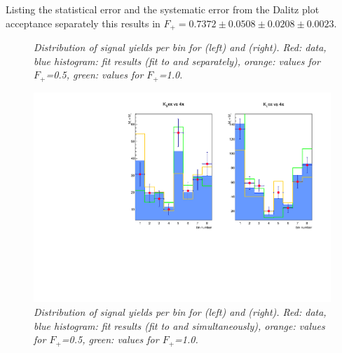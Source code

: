 Listing the statistical error and the systematic error from the Dalitz plot acceptance separately this results in $F_+ = 0.7372 \pm 0.0508 \pm 0.0208 \pm 0.0023$.

\begin{figure}[!h]
\begin{center}
\end{center}
\caption{\textit{Distribution of signal yields per bin for \KsPiPi (left) and \KlPiPi (right). Red: data, blue histogram: fit results (fit to \KsPiPi and \KlPiPi separately), orange: values for $F_+$=0.5, green: values for $F_+$=1.0.}}
\end{figure}

\begin{figure}[!h]
\begin{center}
 \includegraphics[width=1. \textwidth] {Sim_F_Comp.pdf}
\end{center}
\caption{\textit{Distribution of signal yields per bin for \KsPiPi (left) and \KlPiPi (right). Red: data, blue histogram: fit results (fit to \KsPiPi and \KlPiPi simultaneously), orange: values for $F_+$=0.5, green: values for $F_+$=1.0.}}
\end{figure}